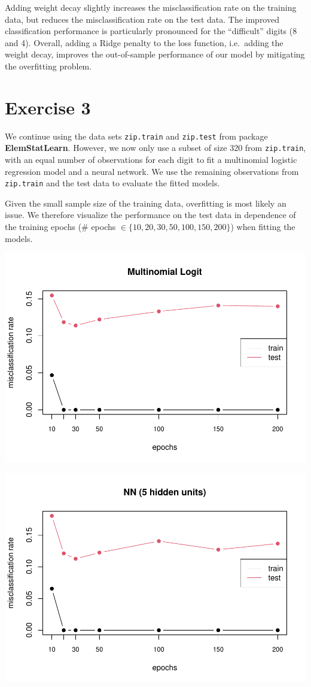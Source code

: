 \documentclass[
]{article}
\begin{document}
Adding weight decay slightly increases the misclassification rate on the
training data, but reduces the misclassification rate on the test data.
The improved classification performance is particularly pronounced for
the ``difficult'' digits (8 and 4). Overall, adding a Ridge penalty to
the loss function, i.e.~adding the weight decay, improves the
out-of-sample performance of our model by mitigating the overfitting
problem.

\newpage

\section{Exercise 3}\label{exercise-3}

We continue using the data sets \texttt{zip.train} and \texttt{zip.test}
from package \textbf{ElemStatLearn}. However, we now only use a subset
of size 320 from \texttt{zip.train}, with an equal number of
observations for each digit to fit a multinomial logistic regression
model and a neural network. We use the remaining observations from
\texttt{zip.train} and the test data to evaluate the fitted models.

Given the small sample size of the training data, overfitting is most
likely an issue. We therefore visualize the performance on the test data
in dependence of the training epochs (\# epochs
\(\in \{10,20,30,50,100,150,200\}\)) when fitting the models.

\includegraphics[width=0.9\linewidth]{A4_files/figure-latex/unnamed-chunk-13-1}

\includegraphics[width=0.9\linewidth]{A4_files/figure-latex/unnamed-chunk-14-1}
\end{document}
